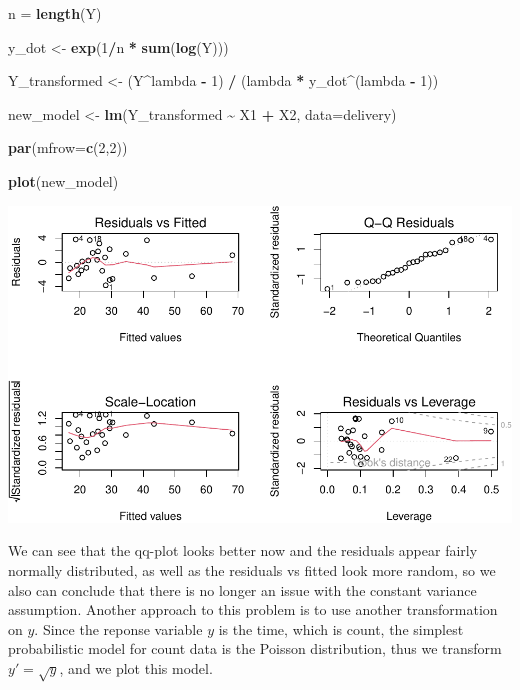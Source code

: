 \documentclass[
  11pt,
]{article}
\newenvironment{Shaded}{\begin{snugshade}}{\end{snugshade}}
\newcommand{\AttributeTok}[1]{\textcolor[rgb]{0.13,0.29,0.53}{#1}}
\newcommand{\DecValTok}[1]{\textcolor[rgb]{0.00,0.00,0.81}{#1}}
\newcommand{\FunctionTok}[1]{\textcolor[rgb]{0.13,0.29,0.53}{\textbf{#1}}}
\newcommand{\NormalTok}[1]{#1}
\newcommand{\OtherTok}[1]{\textcolor[rgb]{0.56,0.35,0.01}{#1}}
\newcommand{\SpecialCharTok}[1]{\textcolor[rgb]{0.81,0.36,0.00}{\textbf{#1}}}
\begin{document}
\begin{Shaded}
\begin{Highlighting}[]
\NormalTok{n }\OtherTok{=} \FunctionTok{length}\NormalTok{(Y)}

\NormalTok{y\_dot }\OtherTok{\textless{}{-}} \FunctionTok{exp}\NormalTok{(}\DecValTok{1}\SpecialCharTok{/}\NormalTok{n }\SpecialCharTok{*} \FunctionTok{sum}\NormalTok{(}\FunctionTok{log}\NormalTok{(Y)))}

\NormalTok{Y\_transformed }\OtherTok{\textless{}{-}}\NormalTok{ (Y}\SpecialCharTok{\^{}}\NormalTok{lambda }\SpecialCharTok{{-}} \DecValTok{1}\NormalTok{) }\SpecialCharTok{/}\NormalTok{ (lambda }\SpecialCharTok{*}\NormalTok{ y\_dot}\SpecialCharTok{\^{}}\NormalTok{(lambda }\SpecialCharTok{{-}} \DecValTok{1}\NormalTok{))}

\NormalTok{new\_model }\OtherTok{\textless{}{-}} \FunctionTok{lm}\NormalTok{(Y\_transformed }\SpecialCharTok{\textasciitilde{}}\NormalTok{ X1 }\SpecialCharTok{+}\NormalTok{ X2, }\AttributeTok{data=}\NormalTok{delivery)}

\FunctionTok{par}\NormalTok{(}\AttributeTok{mfrow=}\FunctionTok{c}\NormalTok{(}\DecValTok{2}\NormalTok{,}\DecValTok{2}\NormalTok{))}

\FunctionTok{plot}\NormalTok{(new\_model)}
\end{Highlighting}
\end{Shaded}

\includegraphics{examples_files/figure-latex/unnamed-chunk-30-1.pdf}

We can see that the qq-plot looks better now and the residuals appear
fairly normally distributed, as well as the residuals vs fitted look
more random, so we also can conclude that there is no longer an issue
with the constant variance assumption. Another approach to this problem
is to use another transformation on \(y\). Since the reponse variable
\(y\) is the time, which is count, the simplest probabilistic model for
count data is the Poisson distribution, thus we transform
\(y' = \sqrt{y}\), and we plot this model.
\end{document}
